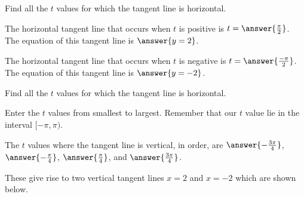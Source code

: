 \documentclass{ximera}
\begin{document}
\begin{exercise}
\begin{exercise}
Find all the $t$ values for which the tangent line is horizontal. 

The horizontal tangent line that occurs when $t$ is positive is $t=\answer{ \frac{\pi}{2}}$. The equation of this tangent line is $\answer{ y=2}$.  

The horizontal tangent line that occurs when $t$ is negative is  $t=\answer{ \frac{-\pi}{2}}$. The equation of this tangent line is $\answer {y=-2}$. 

Find all the $t$ values for which the tangent line is horizontal. 

Enter the $t$ values from smallest to largest. Remember that our $t$ value lie in the interval $[-\pi, \pi)$. 

The $t$ values where the tangent line is vertical, in order, are $\answer{-\frac{3\pi}{4}}$, $\answer{ -\frac{\pi}{4}}$, $\answer{ \frac{\pi}{4}}$, and $\answer{ \frac{ 3\pi}{4}}$. 

These give rise to two vertical tangent lines $x=2$ and $x=-2$ which are shown below. 

\begin{image}  
\end{image} 

\end{exercise}
\end{exercise}
\end{document}
